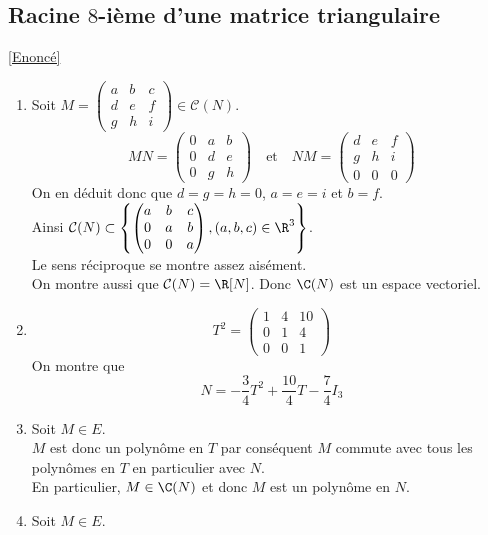 \documentclass[8pt]{book}
\begin{document}
	\subsection{Racine $8$-ième d'une matrice triangulaire }
	\label{Racine $8$-ième d'une matrice triangulaire corrigé}
	\textcolor{blue}{\hyperref[Racine $8$-ième d'une matrice triangulaire]{[Enoncé]}}\\
	\begin{enumerate}[leftmargin=*]	
		\item Soit $M=\begin{pmatrix}
			a&b&c\\
			d&e&f\\
			g&h&i
		\end{pmatrix}\in\mathcal{C}(N)$.
		\[MN=\begin{pmatrix}
			0&a&b\\
			0&d&e\\
			0&g&h
		\end{pmatrix}
		\quad\text{et}\quad 
		NM=\begin{pmatrix}
			d&e&f\\
			g&h&i\\
			0&0&0
		\end{pmatrix}\]
		On en déduit donc que $d=g=h=0$, $a=e=i$ et $b=f$.\\
		Ainsi $\mathcal{C}(N)\subset\left\{\begin{pmatrix}
			a&b&c\\
			0&a&b\\
			0&0&a		
		\end{pmatrix}, (a,b,c)\in\R^3\right\}$.\\
		Le sens réciproque se montre assez aisément.\\
		On montre aussi que $\mathcal{C}(N)=\R[N]$. Donc $\C(N)$ est un espace vectoriel.
		\item \[T^2=\begin{pmatrix}
			1&4&10\\
			0&1&4\\
			0&0&1
		\end{pmatrix}\]
		On montre que \[N=-\frac{3}{4}T^2+\frac{10}{4}T-\frac{7}{4}I_3\]
		\item Soit $M\in E$.\\
		$M$ est donc un polynôme en $T$ par conséquent $M$ commute avec tous les polynômes en $T$ en particulier avec $N$.\\
		En particulier, $M\in\C(N)$ et donc $M$ est un polynôme en $N$.
		\item Soit $M\in E$.\\

\end{enumerate}
\end{document}
